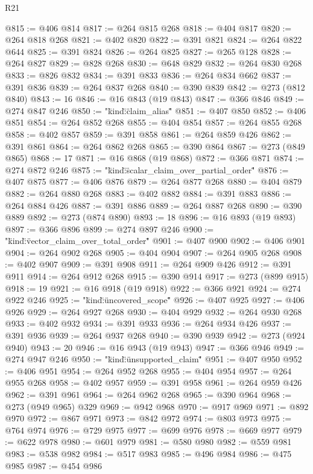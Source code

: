 \begin{lexlean}{R21}
\begin{coremodule}
{{{{{{{{{{{{{{@815 := @406 @814
@817 := @264 @815 @268
@818 := @404 @817
@820 := @264 @818 @268
@821 := @402 @820
@822 := @391 @821
@824 := @264 @822 @644
@825 := @391 @824
@826 := @264 @825
@827 := @265 @128
@828 := @264 @827
@829 := @828 @268
@830 := @648 @829
@832 := @264 @830 @268
@833 := @826 @832
@834 := @391 @833
@836 := @264 @834 @662
@837 := @391 @836
@839 := @264 @837 @268
@840 := @390 @839
@842 := @273 (@812 @840)
@843 := 16
@846 := @16 @843 (@19 @843)
@847 := @366 @846
@849 := @274 @847 @246
@850 := "{\"kind\":\"claim_alias\""
@851 := @407 @850
@852 := @406 @851
@854 := @264 @852 @268
@855 := @404 @854
@857 := @264 @855 @268
@858 := @402 @857
@859 := @391 @858
@861 := @264 @859 @426
@862 := @391 @861
@864 := @264 @862 @268
@865 := @390 @864
@867 := @273 (@849 @865)
@868 := 17
@871 := @16 @868 (@19 @868)
@872 := @366 @871
@874 := @274 @872 @246
@875 := "{\"kind\":\"scalar_claim_over_partial_order\""
@876 := @407 @875
@877 := @406 @876
@879 := @264 @877 @268
@880 := @404 @879
@882 := @264 @880 @268
@883 := @402 @882
@884 := @391 @883
@886 := @264 @884 @426
@887 := @391 @886
@889 := @264 @887 @268
@890 := @390 @889
@892 := @273 (@874 @890)
@893 := 18
@896 := @16 @893 (@19 @893)
@897 := @366 @896
@899 := @274 @897 @246
@900 := "{\"kind\":\"vector_claim_over_total_order\""
@901 := @407 @900
@902 := @406 @901
@904 := @264 @902 @268
@905 := @404 @904
@907 := @264 @905 @268
@908 := @402 @907
@909 := @391 @908
@911 := @264 @909 @426
@912 := @391 @911
@914 := @264 @912 @268
@915 := @390 @914
@917 := @273 (@899 @915)
@918 := 19
@921 := @16 @918 (@19 @918)
@922 := @366 @921
@924 := @274 @922 @246
@925 := "{\"kind\":\"uncovered_scope\""
@926 := @407 @925
@927 := @406 @926
@929 := @264 @927 @268
@930 := @404 @929
@932 := @264 @930 @268
@933 := @402 @932
@934 := @391 @933
@936 := @264 @934 @426
@937 := @391 @936
@939 := @264 @937 @268
@940 := @390 @939
@942 := @273 (@924 @940)
@943 := 20
@946 := @16 @943 (@19 @943)
@947 := @366 @946
@949 := @274 @947 @246
@950 := "{\"kind\":\"unsupported_claim\""
@951 := @407 @950
@952 := @406 @951
@954 := @264 @952 @268
@955 := @404 @954
@957 := @264 @955 @268
@958 := @402 @957
@959 := @391 @958
@961 := @264 @959 @426
@962 := @391 @961
@964 := @264 @962 @268
@965 := @390 @964
@968 := @273 (@949 @965) @329
@969 := @942 @968
@970 := @917 @969
@971 := @892 @970
@972 := @867 @971
@973 := @842 @972
@974 := @803 @973
@975 := @764 @974
@976 := @729 @975
@977 := @699 @976
@978 := @669 @977
@979 := @622 @978
@980 := @601 @979
@981 := @580 @980
@982 := @559 @981
@983 := @538 @982
@984 := @517 @983
@985 := @496 @984
@986 := @475 @985
@987 := @454 @986
}}}}}}}}}}}}}}}}}}}
\end{coremodule}
\end{lexlean}
